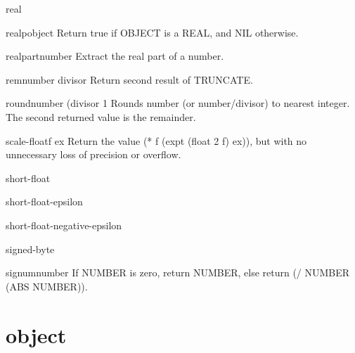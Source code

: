 \begin{class}{real}{}{}
  
\end{class}

\begin{function}{realp}{object}{}
  Return true if OBJECT is a REAL, and NIL otherwise.
\end{function}

\begin{function}{realpart}{number}{}
  Extract the real part of a number.
\end{function}

\begin{function}{rem}{number divisor}{}
  Return second result of TRUNCATE.
\end{function}

\begin{function}{round}{number \op (divisor 1}{}
  Rounds number (or number/divisor) to nearest integer.
  The second returned value is the remainder.
\end{function}

\begin{function}{scale-float}{f ex}{}
  Return the value (* f (expt (float 2 f) ex)), but with no unnecessary loss
  of precision or overflow.
\end{function}

\begin{type}{short-float}{}{}
  
\end{type}

\begin{constant}{short-float-epsilon}{}{}
  
\end{constant}

\begin{constant}{short-float-negative-epsilon}{}{}
  
\end{constant}

\begin{type}{signed-byte}{}{}
  
\end{type}

\begin{function}{signum}{number}{}
  If NUMBER is zero, return NUMBER, else return (/ NUMBER (ABS NUMBER)).
\end{function}

\section{object}

